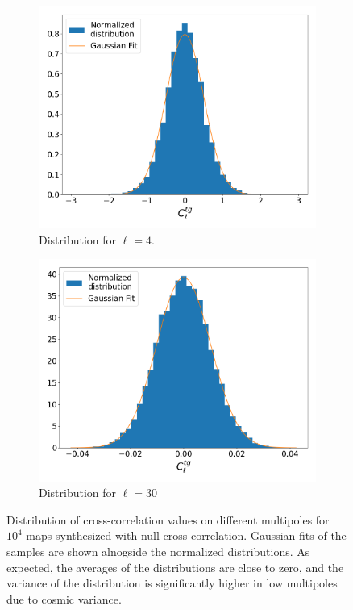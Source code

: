 \documentclass[openany,a4paper,12pt,oneside]{book}
\begin{document}
\begin{spacing}{1.5}
\begin{figure}[!htb]
	\centering
	\begin{subfigure}[b]{0.49\textwidth}
		\includegraphics[width=\linewidth]{Imagens/hist_l4.png}
		\caption{Distribution for $\ell=4$.}
		\label{subfig:Hist_l4}
	\end{subfigure}
	\hfill
	\begin{subfigure}[b]{0.49\textwidth}
		\includegraphics[width=\linewidth]{Imagens/hist_l30.png}
		\caption{Distribution for $\ell=30$}
		\label{subfig:Hist_l30}
	\end{subfigure}
	\caption{Distribution of cross-correlation values on different multipoles for $10^4$ maps synthesized with null cross-correlation. Gaussian fits of the samples are shown alnogside the normalized distributions. As expected, the averages of the distributions are close to zero, and the variance of the distribution is significantly higher in low multipoles due to cosmic variance.}
	\label{fig:synthmaps_histograms}
\end{figure}


\end{spacing}
\end{document}
